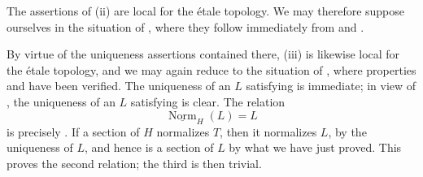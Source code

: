 The assertions of \textup{(ii)} are local for the étale topology.
We may therefore suppose ourselves in the situation of ,
where they follow immediately from \textup{} and \textup{}.

By virtue of the uniqueness assertions contained there,
\textup{(iii)} is likewise local for the étale topology, and we may
again reduce to the situation of , where properties
\textup{} and \textup{} have been verified. The uniqueness of
an \(L\) satisfying \textup{} is immediate; in view of
\textup{}, the uniqueness of an \(L\) satisfying \textup{}
is clear. The relation
\[
  \underline{\operatorname{Norm}}_H(L)=L
\]
is precisely . If a section of \(H\) normalizes \(T\),
then it normalizes \(L\), by the uniqueness of \(L\), and hence is
a section of \(L\) by what we have just proved. This proves the
second relation; the third is then trivial.


